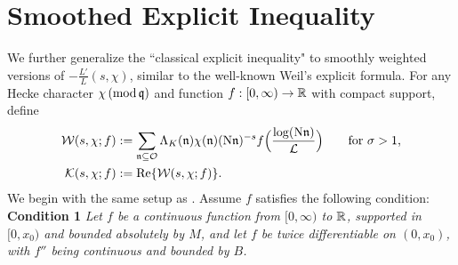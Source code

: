 \documentclass[12pt,psamsfonts]{amsart}
\theoremstyle{definition}
\theoremstyle{remark}
\numberwithin{equation}{section}
\begin{document}
\section{Smoothed Explicit Inequality}
\label{GeneralizedExpIneq}
We further generalize the ``classical explicit inequality" to smoothly weighted versions of $-\tfrac{L'}{L}(s,\chi)$, similar to the well-known Weil's explicit formula. For any Hecke character $\chi \, (\mathrm{mod} {\, \mathfrak{q}})$ and function $f : [0,\infty) \rightarrow \mathbb{R}$ with compact support, define
\begin{align*}
\mathcal{W}(s,\chi; f) & := \sum_{\mathfrak{n} \subseteq \mathcal{O}} \Lambda_K(\mathfrak{n}) \chi(\mathfrak{n}) (\mathrm{N}\mathfrak{n})^{-s} f\Big(\frac{\log (\mathrm{N}\mathfrak{n})}{\mathcal{L}} \Big) \qquad \text{for $\sigma > 1$,} \\
\mathcal{K}(s,\chi;f) & := \mathrm{Re}\{ \mathcal{W}(s,\chi;f) \}.
\end{align*}
We begin with the same setup as \cite[Section 5]{HBLinnik}. Assume $f$ satisfies the following condition:\\

\noindent
\textbf{Condition 1} \emph{Let $f$ be a continuous function from $[0,\infty)$ to $\mathbb{R}$, supported in $[0,x_0)$ and bounded absolutely by $M$, and let $f$ be twice differentiable on $(0,x_0)$, with $f''$ being continuous and bounded by $B$.}\\
\end{document}
